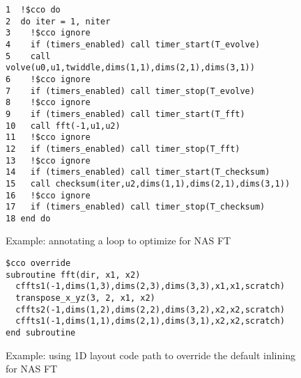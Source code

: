 \begin{figure}[h]
{\scriptsize
\begin{verbatim}
1  !$cco do
2  do iter = 1, niter
3    !$cco ignore
4    if (timers_enabled) call timer_start(T_evolve)
5    call volve(u0,u1,twiddle,dims(1,1),dims(2,1),dims(3,1))
6    !$cco ignore
7    if (timers_enabled) call timer_stop(T_evolve)
8    !$cco ignore
9    if (timers_enabled) call timer_start(T_fft)
10   call fft(-1,u1,u2)
11   !$cco ignore
12   if (timers_enabled) call timer_stop(T_fft)
13   !$cco ignore
14   if (timers_enabled) call timer_start(T_checksum)
15   call checksum(iter,u2,dims(1,1),dims(2,1),dims(3,1))
16   !$cco ignore
17   if (timers_enabled) call timer_stop(T_checksum)
18 end do
\end{verbatim}
}
\caption{Example: annotating a loop to optimize for NAS FT}
\label{fig:code:ft}
\end{figure}

\begin{figure}[h]
{\scriptsize
\begin{verbatim}
$cco override
subroutine fft(dir, x1, x2)
  cffts1(-1,dims(1,3),dims(2,3),dims(3,3),x1,x1,scratch)
  transpose_x_yz(3, 2, x1, x2)
  cffts2(-1,dims(1,2),dims(2,2),dims(3,2),x2,x2,scratch)
  cffts1(-1,dims(1,1),dims(2,1),dims(3,1),x2,x2,scratch)
end subroutine
\end{verbatim}
}
\caption{Example: using 1D layout code path to override the default inlining for NAS FT}
\label{fig:annot:ft}
\end{figure}



